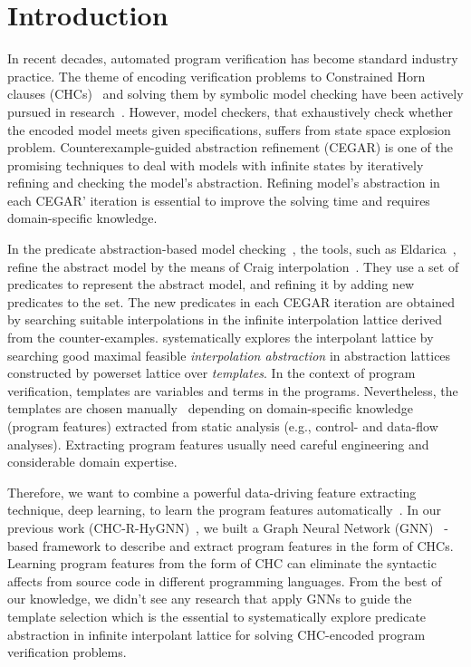 



\section{Introduction}
In recent decades, automated program verification has become standard industry practice. 
%
The theme of encoding verification problems to Constrained Horn clauses (CHCs)~\cite{10.2307/2268661} and solving them by symbolic model checking have been actively pursued in research~\cite{Bjorner2015}. 
%
However, model checkers, that exhaustively check whether the encoded model meets given specifications, suffers from state space explosion problem. 
%
%
Counterexample-guided abstraction refinement (CEGAR) \cite{10.1007/10722167_15} is one of the promising techniques to deal with models with infinite states by iteratively refining and checking the model's abstraction.
%
Refining model's abstraction in each CEGAR' iteration is essential to improve the solving time and requires domain-specific knowledge.  


In the predicate abstraction-based model checking~\cite{10.1007/3-540-63166-6_10,10.1145/964001.964021}, the tools, such as %
Eldarica~\cite{ruemmer2013disjunctive}, refine the abstract model by the means of Craig interpolation~\cite{10.2307/2963593}. 
%
They use a set of predicates to represent the abstract model, and refining it by adding new predicates to the set. The new predicates in each CEGAR iteration are obtained by searching suitable interpolations in the infinite interpolation lattice derived from the counter-examples.
%
\cite{Leroux2016} systematically explores the interpolant lattice by searching good maximal feasible \emph{interpolation abstraction} in abstraction lattices constructed by powerset lattice over \emph{templates}. In the context of program verification, templates are variables and terms in the programs.
%
Nevertheless, the templates are chosen manually~\cite{10.1007/978-3-319-57288-8_18} depending on domain-specific knowledge (program features) extracted from static analysis (e.g., control- and data-flow analyses). 
%
Extracting program features usually need careful engineering and considerable domain expertise.


Therefore, we want to combine a powerful data-driving feature extracting technique, deep learning, to learn the program features automatically~\cite{DBLP:journals/corr/abs-1711-00740}. 
%
In our previous work (CHC-R-HyGNN)~\cite{tech-report}, we built a Graph Neural Network (GNN)~\cite{DBLP:journals/corr/abs-1806-01261} -based framework to describe and extract program features in the form of CHCs. 
%
Learning program features from the form of CHC can eliminate the syntactic affects from source code in different programming languages. 
%
From the best of our knowledge, we didn't see any research that apply GNNs to guide the template selection which is the essential to systematically explore predicate abstraction in infinite interpolant lattice for solving CHC-encoded program verification problems. 

